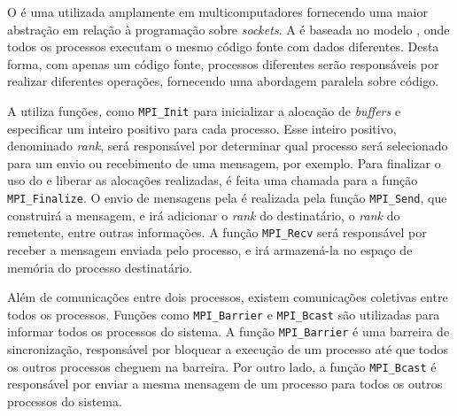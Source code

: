 O \mpi é uma \api utilizada amplamente em multicomputadores fornecendo uma maior
abstração em relação à programação sobre \textit{sockets}. A \api é baseada no
modelo \spmd, onde todos os processos executam o mesmo código fonte com
dados diferentes. Desta forma, com apenas um código fonte, processos diferentes
serão responsáveis por realizar diferentes operações, fornecendo uma abordagem
paralela sobre código.

A \api utiliza funções, como \texttt{MPI\_Init} para inicializar a alocação de
\textit{buffers} e  especificar um inteiro positivo para cada processo. Esse
inteiro positivo, denominado \textit{rank}, será responsável por determinar qual
processo será selecionado para um envio ou recebimento de uma mensagem, por
exemplo. Para finalizar o uso do \mpi e liberar as alocações realizadas, é feita
uma chamada para a função \texttt{MPI\_Finalize}. O envio de mensagens pela \api
é realizada pela função \texttt{MPI\_Send}, que construirá a mensagem, e irá
adicionar o \textit{rank} do destinatário, o \textit{rank} do remetente, entre
outras informações. A função \texttt{MPI\_Recv} será responsável por receber a
mensagem enviada pelo processo, e irá armazená-la no espaço de memória
do processo destinatário.

Além de comunicações entre dois processos, existem comunicações coletivas entre
todos os processos. Funções como \texttt{MPI\_Barrier} e \texttt{MPI\_Bcast} são
utilizadas para informar todos os processos do sistema. A função
\texttt{MPI\_Barrier} é uma barreira de sincronização, responsável por bloquear a
execução de um processo até que todos os outros processos cheguem na barreira.
Por outro lado, a função \texttt{MPI\_Bcast} é responsável por enviar a mesma
mensagem de um processo para todos os outros processos do sistema.

